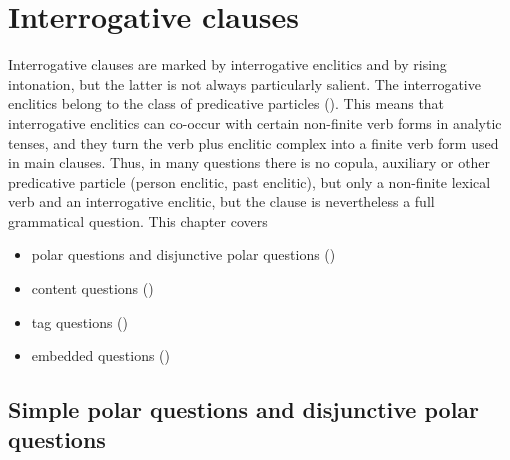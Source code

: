 \chapter{Interrogative clauses}
\label{cpt:Interrogative clauses}

Interrogative clauses are marked by interrogative enclitics and by rising intonation, but the latter is not always particularly salient. The interrogative enclitics belong to the class of predicative particles (). This means that interrogative enclitics can co-occur with certain non-finite verb forms in analytic tenses, and they turn the verb plus enclitic complex into a finite verb form used in main clauses. Thus, in many questions there is no copula, auxiliary or other predicative particle (person enclitic, past enclitic), but only a non-finite lexical verb and an interrogative enclitic, but the clause is nevertheless a full grammatical question. This chapter covers
%
\begin{itemize}
	\item	polar questions and disjunctive polar questions ()
	\item	content questions ()
	\item	tag questions ()
	\item	embedded questions ()
\end{itemize}



\section{Simple polar questions and disjunctive polar questions}
\label{sec:Simple polar questions and disjunctive polar questions}


